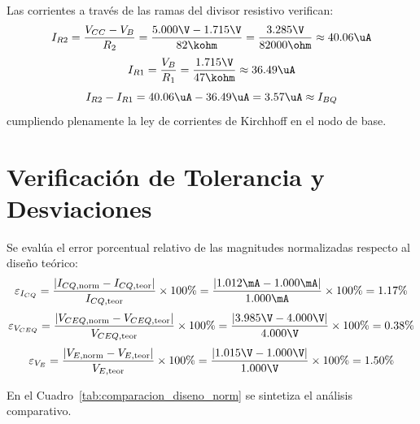 Las corrientes a través de las ramas del divisor resistivo verifican:
\begin{equation}
  I_{R2} = \frac{V_{CC} - V_B}{R_2} = \frac{5.000\V - 1.715\V}{82\kohm} = \frac{3.285\V}{82000\ohm} \approx 40.06\uA
\end{equation}
\begin{equation}
  I_{R1} = \frac{V_B}{R_1} = \frac{1.715\V}{47\kohm} \approx 36.49\uA
\end{equation}
\begin{equation}
  I_{R2} - I_{R1} = 40.06\uA - 36.49\uA = 3.57\uA \approx I_{BQ}
\end{equation}
cumpliendo plenamente la ley de corrientes de Kirchhoff en el nodo de base.

\section{Verificación de Tolerancia y Desviaciones}

Se evalúa el error porcentual relativo de las magnitudes normalizadas respecto al diseño teórico:
\begin{equation}
  \varepsilon_{I_{CQ}} = \frac{|I_{CQ,\mathrm{norm}} - I_{CQ,\mathrm{teor}}|}{I_{CQ,\mathrm{teor}}} \times 100\% = \frac{|1.012\mA - 1.000\mA|}{1.000\mA} \times 100\% = 1.17\%
\end{equation}
\begin{equation}
  \varepsilon_{V_{CEQ}} = \frac{|V_{CEQ,\mathrm{norm}} - V_{CEQ,\mathrm{teor}}|}{V_{CEQ,\mathrm{teor}}} \times 100\% = \frac{|3.985\V - 4.000\V|}{4.000\V} \times 100\% = 0.38\%
\end{equation}
\begin{equation}
  \varepsilon_{V_E} = \frac{|V_{E,\mathrm{norm}} - V_{E,\mathrm{teor}}|}{V_{E,\mathrm{teor}}} \times 100\% = \frac{|1.015\V - 1.000\V|}{1.000\V} \times 100\% = 1.50\%
\end{equation}

En el Cuadro~\ref{tab:comparacion_diseno_norm} se sintetiza el análisis comparativo.

